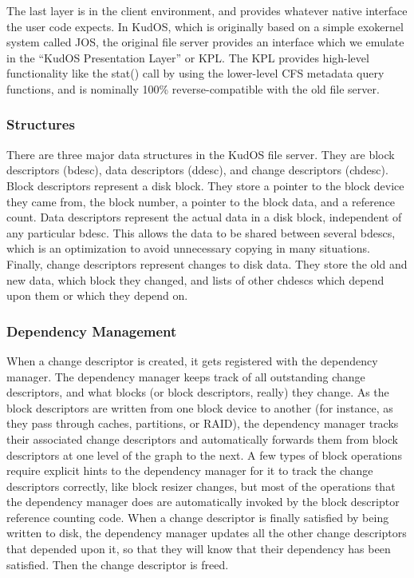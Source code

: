 The last layer is in the client environment, and provides whatever native
interface the user code expects. In KudOS, which is originally based on a simple
exokernel system called JOS, the original file server provides an interface
which we emulate in the ``KudOS Presentation Layer'' or KPL. The KPL provides
high-level functionality like the stat() call by using the lower-level CFS
metadata query functions, and is nominally 100\% reverse-compatible with the old
file server.

\subsubsection{Structures}
\label{sec:solution:arch:structs}

There are three major data structures in the KudOS file server. They are block
descriptors (bdesc), data descriptors (ddesc), and change descriptors (chdesc).
Block descriptors represent a disk block. They store a pointer to the block
device they came from, the block number, a pointer to the block data, and a
reference count. Data descriptors represent the actual data in a disk block,
independent of any particular bdesc. This allows the data to be shared between
several bdescs, which is an optimization to avoid unnecessary copying in many
situations. Finally, change descriptors represent changes to disk data. They
store the old and new data, which block they changed, and lists of other chdescs
which depend upon them or which they depend on.

\subsubsection{Dependency Management}
\label{sec:solution:arch:depman}

When a change descriptor is created, it gets registered with the dependency
manager. The dependency manager keeps track of all outstanding change
descriptors, and what blocks (or block descriptors, really) they change. As the
block descriptors are written from one block device to another (for instance, as
they pass through caches, partitions, or RAID), the dependency manager tracks
their associated change descriptors and automatically forwards them from block
descriptors at one level of the graph to the next. A few types of block
operations require explicit hints to the dependency manager for it to track the
change descriptors correctly, like block resizer changes, but most of the
operations that the dependency manager does are automatically invoked by the
block descriptor reference counting code. When a change descriptor is finally
satisfied by being written to disk, the dependency manager updates all the other
change descriptors that depended upon it, so that they will know that their
dependency has been satisfied. Then the change descriptor is freed.

